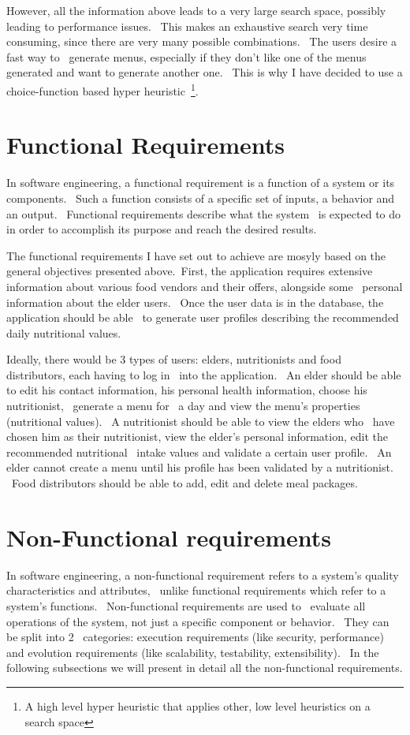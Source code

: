 However, all the information above leads to a very large search space, possibly leading to performance issues. \
This makes an exhaustive search very time consuming, since there are very many possible combinations. \
The users desire a fast way to \
generate menus, especially if they don't like one of the menus generated and want to generate another one. \
This is why I have decided to use a choice-function based hyper heuristic\
\footnote{A high level hyper heuristic that applies other, low level heuristics on a search space}.


\section{Functional Requirements}
\label{sec:specification-functional}

In software engineering, a functional requirement is a function of a system or its components. \
Such a function consists of a specific set of inputs, a behavior and an output. \
Functional requirements describe what the system \
is expected to do in order to accomplish its purpose and reach the desired results.

The functional requirements I have set out to achieve are mosyly based on the general objectives presented above.\
First, the application requires extensive information about various food vendors and their offers, alongside some \
personal information about the elder users. \
Once the user data is in the database, the application should be able \
to generate user profiles describing the recommended daily nutritional values.

Ideally, there would be 3 types of users: elders, nutritionists and food distributors, each having to log in \
into the application. \
An elder should be able to edit his contact information, his personal health information, choose his nutritionist, \
generate a menu for \
a day and view the menu's properties (nutritional values). \
A nutritionist should be able to view the elders who \
have chosen him as their nutritionist, view the elder's personal information, edit the recommended nutritional \
intake values and validate a certain user profile. \
An elder cannot create a menu until his profile has been validated by a nutritionist. \
Food distributors should be able to add, edit and delete meal packages.

\section{Non-Functional requirements}
\label{sec:specification-non-functional}
In software engineering, a non-functional requirement refers to a system's quality characteristics and attributes, \
unlike functional requirements which refer to a system's functions. \
Non-functional requirements are used to \
evaluate all operations of the system, not just a specific component or behavior. \
They can be split into 2 \
categories: execution requirements (like security, performance) and evolution requirements (like scalability,
testability, extensibility). \
In the following subsections we will present in detail all the non-functional requirements.

